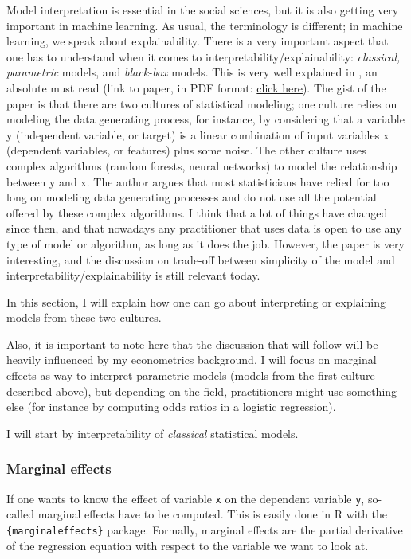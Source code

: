 \documentclass[
]{article}
\begin{document}
Model interpretation is essential in the social sciences, but it is also getting very important
in machine learning. As usual, the terminology is different; in machine learning, we speak about
explainability. There is a very important aspect that one has to understand when it comes to
interpretability/explainability: \emph{classical, parametric} models, and \emph{black-box} models. This
is very well explained in \citet{breiman2001}, an absolute must read (link to paper, in PDF format:
\href{https://projecteuclid.org/download/pdf_1/euclid.ss/1009213726}{click here}). The gist of the paper
is that there are two cultures of statistical modeling; one culture relies on modeling the data
generating process, for instance, by considering that a variable y (independent variable, or target)
is a linear combination of input variables x (dependent variables, or features) plus some noise. The
other culture uses complex algorithms (random forests, neural networks)
to model the relationship between y and x. The author argues that most statisticians have relied
for too long on modeling data generating processes and do not use all the potential offered by
these complex algorithms. I think that a lot of things have changed since then, and that nowadays
any practitioner that uses data is open to use any type of model or algorithm, as long as it does
the job. However, the paper is very interesting, and the discussion on trade-off between
simplicity of the model and interpretability/explainability is still relevant today.

In this section, I will explain how one can go about interpreting or explaining models from these
two cultures.

Also, it is important to note here that the discussion that will follow will be heavily influenced
by my econometrics background. I will focus on marginal effects as way to interpret parametric
models (models from the first culture described above), but depending on the field, practitioners
might use something else (for instance by computing odds ratios in a logistic regression).

I will start by interpretability of \emph{classical} statistical models.

\hypertarget{marginal-effects}{%
\subsubsection{Marginal effects}\label{marginal-effects}}

If one wants to know the effect of variable \texttt{x} on the dependent variable \texttt{y},
so-called marginal effects have to be computed. This is easily done in R with the \texttt{\{marginaleffects\}} package.
Formally, marginal effects are the partial derivative of the regression equation with respect to the variable
we want to look at.
\end{document}
